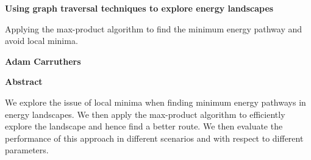 
\begin{titlepage}
    \thispagestyle{plain}
    \begin{center}
        \Large
        \textbf{Using graph traversal techniques to explore energy landscapes}

        \vspace{0.4cm}
        \large
        Applying the max-product algorithm to find the minimum energy pathway and avoid local minima.

        \vspace{0.4cm}
        \textbf{Adam Carruthers}

        \vspace{0.9cm}
        \textbf{Abstract}
    \end{center}
    We explore the issue of local minima when finding minimum energy pathways in energy landscapes.
    We then apply the max-product algorithm to efficiently explore the landscape and hence find a better route.
    We then evaluate the performance of this approach in different scenarios and with respect to different parameters.
\end{titlepage}